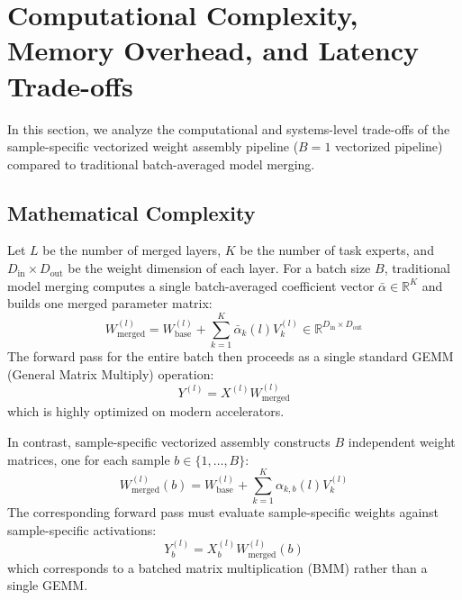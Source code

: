 \documentclass{article}
\theoremstyle{plain}
\theoremstyle{definition}
\theoremstyle{remark}
\begin{document}










\newpage
\appendix
\onecolumn

\section{Computational Complexity, Memory Overhead, and Latency Trade-offs}
\label{app:complexity}
In this section, we analyze the computational and systems-level trade-offs of the sample-specific vectorized weight assembly pipeline ($B=1$ vectorized pipeline) compared to traditional batch-averaged model merging.

\subsection{Mathematical Complexity}
Let $L$ be the number of merged layers, $K$ be the number of task experts, and $D_{\text{in}} \times D_{\text{out}}$ be the weight dimension of each layer. For a batch size $B$, traditional model merging computes a single batch-averaged coefficient vector $\bar{\alpha} \in \mathbb{R}^K$ and builds one merged parameter matrix:
\begin{equation}
    W_{\text{merged}}^{(l)} = W_{\text{base}}^{(l)} + \sum_{k=1}^K \bar{\alpha}_k(l) V_k^{(l)} \in \mathbb{R}^{D_{\text{in}} \times D_{\text{out}}}
\end{equation}
The forward pass for the entire batch then proceeds as a single standard GEMM (General Matrix Multiply) operation:
\begin{equation}
    Y^{(l)} = X^{(l)} W_{\text{merged}}^{(l)}
\end{equation}
which is highly optimized on modern accelerators.

In contrast, sample-specific vectorized assembly constructs $B$ independent weight matrices, one for each sample $b \in \{1, \dots, B\}$:
\begin{equation}
    W_{\text{merged}}^{(l)}(b) = W_{\text{base}}^{(l)} + \sum_{k=1}^K \alpha_{k, b}(l) V_k^{(l)}
\end{equation}
The corresponding forward pass must evaluate sample-specific weights against sample-specific activations:
\begin{equation}
    Y^{(l)}_b = X^{(l)}_b W_{\text{merged}}^{(l)}(b)
\end{equation}
which corresponds to a batched matrix multiplication (BMM) rather than a single GEMM.
\end{document}
